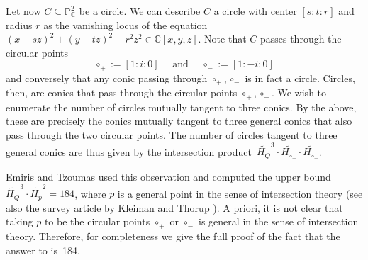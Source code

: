 \documentclass[12pt]{amsart}
\theoremstyle{definition}
\theoremstyle{definition}
\numberwithin{equation}{section}
\begin{document}
Let now $C\subseteq\mathbb{P}^{2}_{\mathbb{C}}$ be a circle. We can describe $C$ a circle with center $[s:t:r]$ and radius $r$ as the vanishing locus of the equation $(x-sz)^{2}+(y-tz)^{2}-r^{2}z^{2}\in\mathbb{C}[x,y,z]$. Note that $C$ passes through the circular points 
\begin{equation}\label{circular_points}
\circ_{+}:=[1:i:0]\quad \text{ and }\quad \circ_{-}:=[1:-i:0]
\end{equation}and conversely that any conic passing through $\circ_{+}, \circ_{-}$ is in fact a circle. Circles, then, are conics that pass through the circular points $\circ_{+},\circ_{-}$. We wish to enumerate the number of circles mutually tangent to three conics. By the above, these are precisely the conics mutually tangent to three general conics that also pass through the two circular points. The number of circles tangent to three general conics are thus given by the intersection product~$\widetilde{H_{Q}}^{3}\cdot\widetilde{H_{\circ_{+}}}\cdot\widetilde{H_{\circ_{-}}}$. 

Emiris and Tzoumas \cite{ApollonianCircles} used this observation and computed the upper bound $\widetilde{H_{Q}}^{3}\cdot\widetilde{H_{p}}
^2=184$, where $p$ is a general point in the sense of intersection theory (see also the survey article by Kleiman and Thorup \cite{TK97}). A priori, it is not clear that taking $p$ to be the circular points $\circ_{+}$ or $\circ_{-}$ is general in the sense of intersection theory. Therefore, for completeness we give the full proof of the fact that the answer to  is~184.
\end{document}
